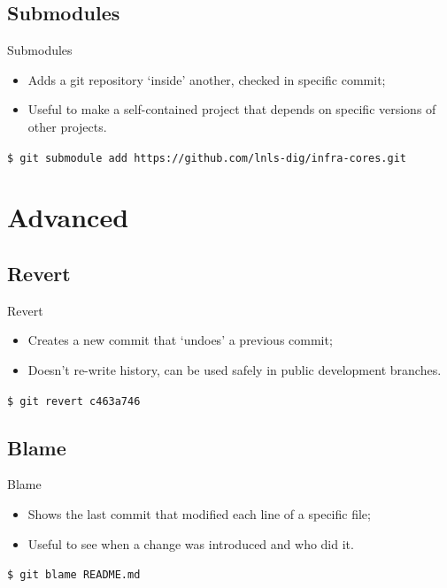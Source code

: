 \documentclass{beamer}
\begin{document}
\subsection{Submodules}
\begin{frame}{Submodules}
  \begin{itemize}
    \item Adds a git repository `inside' another, checked in specific commit;
    \item Useful to make a self-contained project that depends on specific versions of other projects.
  \end{itemize}
  \begin{block}{}
    \texttt{\$ git submodule add https://github.com/lnls-dig/infra-cores.git}
  \end{block}
\end{frame}

\section{Advanced}

\subsection{Revert}
\begin{frame}{Revert}
  \begin{itemize}
    \item Creates a new commit that `undoes' a previous commit;
    \item Doesn't re-write history, can be used safely in public development branches.
  \end{itemize}
  \begin{block}{}
    \texttt{\$ git revert c463a746}
  \end{block}
\end{frame}

\subsection{Blame}
\begin{frame}{Blame}
  \begin{itemize}
    \item Shows the last commit that modified each line of a specific file;
    \item Useful to see when a change was introduced and who did it.
  \end{itemize}
  \begin{block}{}
    \texttt{\$ git blame README.md}
  \end{block}
\end{frame}
\end{document}
